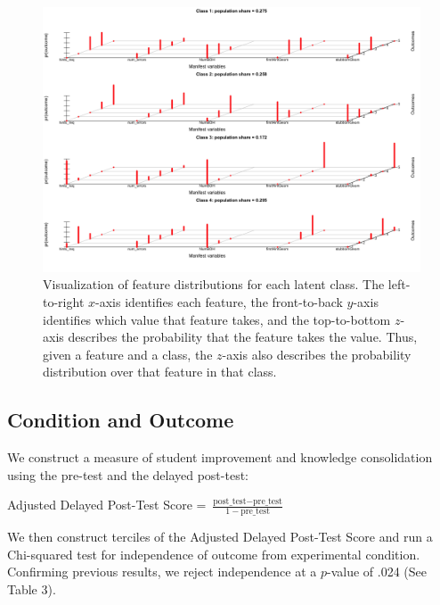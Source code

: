 \documentclass{edm_template}
\begin{document}
\begin{figure}[htbp]
\centering
\includegraphics[scale=0.4]{lca-class-viz.png}
\caption{Visualization of feature distributions for each latent class. The left-to-right $x$-axis identifies each feature, the front-to-back $y$-axis identifies which value that feature takes, and the top-to-bottom $z$-axis describes the probability that the feature takes the value. Thus, given a feature and a class, the $z$-axis also describes the probability distribution over that feature in that class.}
\label{fig:lca-class-viz}
\end{figure}


\subsection{Condition and Outcome} 
We construct a measure of student improvement and knowledge consolidation using the pre-test and the delayed post-test: 
\begin{center}
Adjusted Delayed Post-Test Score = $\frac{\text{post\_test} - \text{pre\_test}}{1-\text{pre\_test}}$
\end{center}
We then construct terciles of the Adjusted Delayed Post-Test Score and run a Chi-squared test for independence of outcome from experimental condition. Confirming previous results, we reject independence at a $p$-value of .024 (See Table 3). 
\end{document}

